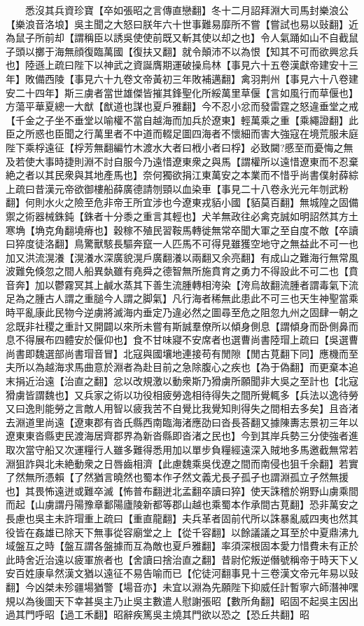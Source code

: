 　　悉沒其兵資珍寶【卒如張昭之言傳直戀翻】冬十二月詔拜淵大司馬封樂浪公【樂浪音洛埌】吳主聞之大怒曰朕年六十世事難易靡所不嘗【嘗試也易以䜴翻】近為鼠子所前却【謂稱臣以誘吳使使前既又斬其使以却之也】令人氣踊如山不自截鼠子頭以擲于海無顔復臨萬國【復扶又翻】就令顛沛不以為恨【知其不可而欲興忿兵也】陸遜上疏曰陛下以神武之資誕膺期運破操烏林【事見六十五卷漢獻帝建安十三年】敗備西陵【事見六十九卷文帝黃初三年敗補邁翻】禽羽荆州【事見六十八卷建安二十四年】斯三虜者當世雄傑皆摧其鋒聖化所綏萬里草偃【言如風行而草偃也】方蕩平華夏總一大猷【猷道也謀也夏戶雅翻】今不忍小忿而發雷霆之怒違垂堂之戒【千金之子坐不垂堂以喻權不當自越海而加兵於遼東】輕萬乘之重【乘繩證翻】此臣之所惑也臣聞之行萬里者不中道而輟足圖四海者不懷細而害大強寇在境荒服未庭陛下乘桴遠征【桴芳無翻編竹木渡水大者曰栰小者曰桴】必致闚?慼至而憂悔之無及若使大事時捷則淵不討自服今乃遠惜遼東衆之與馬【謂權所以遠惜遼東而不忍棄絶之者以其民衆與其地產馬也】奈何獨欲捐江東萬安之本業而不惜乎尚書僕射薛綜上疏曰昔漢元帝欲御樓船薛廣德請刎頸以血染車【事見二十八卷永光元年刎武粉翻】何則水火之險至危非帝王所宜涉也今遼東戎貊小國【貊莫百翻】無城隍之固備禦之術器械銖鈍【銖者十分黍之重言其輕也】犬羊無政往必禽克誠如明詔然其方土寒埆【埆克角翻墝瘠也】穀稼不殖民習鞍馬轉徙無常卒聞大軍之至自度不敵【卒讀曰猝度徒洛翻】鳥驚獸駭長驅奔竄一人匹馬不可得見雖獲空地守之無益此不可一也加又洪流滉瀁【滉瀁水深廣貌滉戶廣翻瀁以兩翻又余亮翻】有成山之難海行無常風波難免倏忽之間人船異埶雖有堯舜之德智無所施賁育之勇力不得設此不可二也【賁音奔】加以鬱霧冥其上鹹水蒸其下善生流腫轉相洿染【洿烏故翻流腫者謂毒氣下流足為之腫古人謂之重膇今人謂之脚氣】凡行海者稀無此患此不可三也天生神聖當乘時平亂康此民物今逆虜將滅海内垂定乃違必然之圖尋至危之阻忽九州之固肆一朝之忿既非社稷之重計又開闢以來所未嘗有斯誠羣僚所以傾身側息【謂傾身而卧側鼻而息不得展布四體安於偃仰也】食不甘味寢不安席者也選曹尚書陸瑁上疏曰【吳選曹尚書即魏選部尚書瑁音冒】北寇與國壤地連接苟有閒隙【閒古莧翻下同】應機而至夫所以為越海求馬曲意於淵者為赴目前之急除腹心之疾也【為于偽翻】而更棄本追末捐近治遠【治直之翻】忿以改規激以動衆斯乃猾虜所願聞非大吳之至計也【北寇猾虜皆謂魏也】又兵家之術以功役相疲勞逸相待得失之間所覺輒多【兵法以逸待勞又曰逸則能勞之言敵人用智以疲我苦不自覺比我覺知則得失之間相去多矣】且沓渚去淵道里尚遠【遼東郡有沓氏縣西南臨海渚應劭曰沓長荅翻又據陳夀志景初三年以遼東東沓縣吏民渡海居齊郡界為新沓縣即沓渚之民也】今到其岸兵勢三分使強者進取次當守船又次運糧行人雖多難得悉用加以單步負糧經遠深入賊地多馬邀截無常若淵狙詐與北未絶動衆之日唇齒相濟【此慮魏乘吳伐遼之間而南侵也狙千余翻】若實了然無所憑賴【了然猶言曉然也蜀本作孑然文義尤長孑孤孑也謂淵孤立孑然無援也】其畏怖遠迸或難卒滅【怖普布翻迸北孟翻卒讀曰猝】使天誅稽於朔野山虜乘間而起【山虜謂丹陽豫章鄱陽廬陵新都等郡山越也乘蜀本作承間古莧翻】恐非萬安之長慮也吳主未許瑁重上疏曰【重直龍翻】夫兵革者固前代所以誅暴亂威四夷也然其役皆在姦雄已除天下無事從容廟堂之上【從千容翻】以餘議議之耳至於中夏鼎沸九域盤互之時【盤互謂各盤據而互為敵也夏戶雅翻】率須深根固本愛力惜費未有正於此時舍近治遠以疲軍旅者也【舍讀曰捨治直之翻】昔尉佗叛逆僭號稱帝于時天下乂安百姓康阜然漢文猶以遠征不易告喻而已【佗徒河翻事見十三卷漢文帝元年易以䜴翻】今凶桀未殄疆場猶警【場音亦】未宜以淵為先願陛下抑威任計暫寧六師潛神嘿規以為後圖天下幸甚吳主乃止吳主數遣人慰謝張昭【數所角翻】昭固不起吳主因出過其門呼昭【過工禾翻】昭辭疾篤吳主燒其門欲以恐之【恐丘共翻】昭